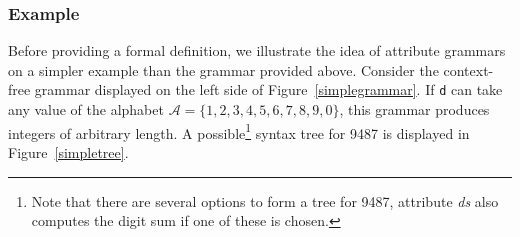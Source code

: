 \subsubsection{Example}
Before providing a formal definition, we illustrate the idea of attribute grammars on a simpler example than the grammar provided above. 
Consider the context-free grammar displayed on the left side of Figure~\ref{simplegrammar}. 
If \texttt{d} can take any value of the alphabet $\mathcal{A}=\{1,2,3,4,5,6,7,8,9,0\}$, %
this 
grammar produces integers of arbitrary length.
%
%
%
A possible\footnote{Note that there are several options to form a tree for 9487, attribute \textit{ds} also computes the digit sum if one of these is chosen.} syntax tree for 9487
is displayed in Figure~\ref{simpletree}. %
%
